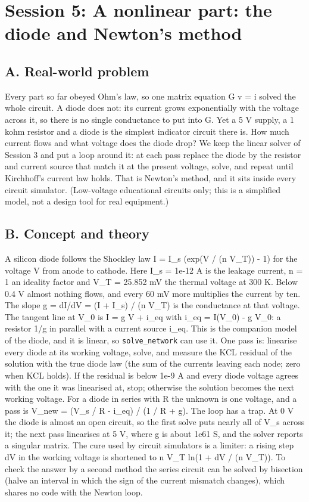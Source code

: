 \documentclass[11pt,a4paper]{article}
\begin{document}
\section{Session 5: A nonlinear part: the diode and Newton's method}

\subsection*{A. Real-world problem}
Every part so far obeyed Ohm's law, so one matrix equation G v = i solved the whole circuit. A diode does not: its current grows exponentially with the voltage across it, so there is no single conductance to put into G. Yet a 5 V supply, a 1 kohm resistor and a diode is the simplest indicator circuit there is. How much current flows and what voltage does the diode drop? We keep the linear solver of Session 3 and put a loop around it: at each pass replace the diode by the resistor and current source that match it at the present voltage, solve, and repeat until Kirchhoff's current law holds. That is Newton's method, and it sits inside every circuit simulator. (Low-voltage educational circuits only; this is a simplified model, not a design tool for real equipment.)

\subsection*{B. Concept and theory}
A silicon diode follows the Shockley law I = I\_s (exp(V / (n V\_T)) - 1) for the voltage V from anode to cathode. Here I\_s = 1e-12 A is the leakage current, n = 1 an ideality factor and V\_T = 25.852 mV the thermal voltage at 300 K. Below 0.4 V almost nothing flows, and every 60 mV more multiplies the current by ten. The slope g = dI/dV = (I + I\_s) / (n V\_T) is the conductance at that voltage. The tangent line at V\_0 is I = g V + i\_eq with i\_eq = I(V\_0) - g V\_0: a resistor 1/g in parallel with a current source i\_eq. This is the companion model of the diode, and it is linear, so \texttt{solve\_network} can use it. One pass is: linearise every diode at its working voltage, solve, and measure the KCL residual of the solution with the true diode law (the sum of the currents leaving each node; zero when KCL holds). If the residual is below 1e-9 A and every diode voltage agrees with the one it was linearised at, stop; otherwise the solution becomes the next working voltage. For a diode in series with R the unknown is one voltage, and a pass is V\_new = (V\_s / R - i\_eq) / (1 / R + g). The loop has a trap. At 0 V the diode is almost an open circuit, so the first solve puts nearly all of V\_s across it; the next pass linearises at 5 V, where g is about 1e61 S, and the solver reports a singular matrix. The cure used by circuit simulators is a limiter: a rising step dV in the working voltage is shortened to n V\_T ln(1 + dV / (n V\_T)). To check the answer by a second method the series circuit can be solved by bisection (halve an interval in which the sign of the current mismatch changes), which shares no code with the Newton loop.
\end{document}
